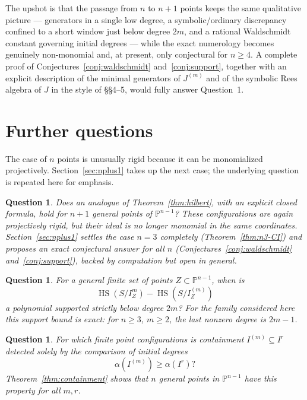 \documentclass[11pt]{article}
\newtheorem{question}[theorem]{Question}
\newcommand{\PP}{\mathbb P}
\newcommand{\HS}{\operatorname{HS}}
\begin{document}
The upshot is that the passage from \(n\) to \(n+1\) points keeps the
same qualitative picture --- generators in a single low degree, a
symbolic/ordinary discrepancy confined to a short window just below
degree \(2m\), and a rational Waldschmidt constant governing initial
degrees --- while the exact numerology becomes genuinely
non-monomial and, at present, only conjectural for \(n\ge4\). A
complete proof of Conjectures~\ref{conj:waldschmidt}
and~\ref{conj:support}, together with an explicit description of the
minimal generators of \(J^{(m)}\) and of the symbolic Rees algebra of
\(J\) in the style of \S\S4--5, would fully answer Question~1.

\section{Further questions}

The case of \(n\) points is unusually rigid because it can be
monomialized projectively.  Section~\ref{sec:nplus1} takes up the
next case; the underlying question is repeated here for emphasis.

\begin{question}
Does an analogue of Theorem~\ref{thm:hilbert}, with an explicit
closed formula, hold for \(n+1\) general points of \(\PP^{n-1}\)?
These configurations are again projectively rigid, but their ideal is
no longer monomial in the same coordinates.  Section~\ref{sec:nplus1}
settles the case \(n=3\) completely (Theorem~\ref{thm:n3-CI}) and
proposes an exact conjectural answer for all \(n\)
(Conjectures~\ref{conj:waldschmidt} and~\ref{conj:support}), backed by
computation but open in general.
\end{question}

\begin{question}
For a general finite set of points \(Z\subset\PP^{n-1}\), when is
\[
 \HS(S/I_Z^m)-\HS(S/I_Z^{(m)})
\]
a polynomial supported strictly below degree \(2m\)?
For the family considered here this support bound is exact:
for \(n\ge3\), \(m\ge2\), the last nonzero degree is \(2m-1\).
\end{question}

\begin{question}
For which finite point configurations is containment
\(I^{(m)}\subseteq I^r\) detected solely by the comparison of initial
degrees
\[
 \alpha(I^{(m)})\ge\alpha(I^r)?
\]
Theorem~\ref{thm:containment} shows that \(n\) general points in
\(\PP^{n-1}\) have this property for all \(m,r\).
\end{question}
\end{document}
